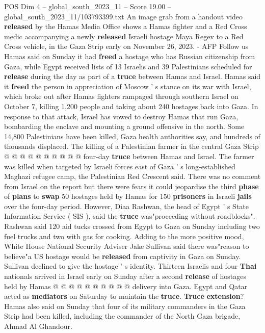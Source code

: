 \begin{textsample}{POS Dim 4 – global\_south\_2023\_11 – Score 19.00 – global\_south\_2023\_11/103793399.txt}  \label{ex:f4_pos_170}
An image grab from a handout video \textbf{released} by the Hamas Media Office shows a Hamas fighter and a Red Cross medic accompanying a newly \textbf{released} Israeli hostage Maya Regev to a Red Cross vehicle, in the Gaza Strip early on November 26, 2023. - AFP Follow us Hamas said on Sunday it had \textbf{freed} a hostage who has Russian citizenship from Gaza, while Egypt received lists of 13 Israelis and 39 Palestinians scheduled for \textbf{release} during the day as part of a \textbf{truce} between Hamas and Israel.
Hamas said it \textbf{freed} the person in appreciation of Moscow ' s stance on its war with Israel, which broke out after Hamas fighters rampaged through southern Israel on October 7, killing 1,200 people and taking about 240 hostages back into Gaza.
In response to that attack, Israel has vowed to destroy Hamas that run Gaza, bombarding the enclave and mounting a ground offensive in the north.
Some 14,800 Palestinians have been killed, Gaza health authorities say, and hundreds of thousands displaced.
The killing of a Palestinian farmer in the central Gaza Strip @ @ @ @ @ @ @ @ @ @ four-day \textbf{truce} between Hamas and Israel.
The farmer was killed when targeted by Israeli forces east of Gaza ' s long-established Maghazi refugee camp, the Palestinian Red Crescent said.
There was no comment from Israel on the report but there were fears it could jeopardise the third \textbf{phase} of \textbf{plans} to \textbf{swap} 50 hostages held by Hamas for 150 \textbf{prisoners} in Israeli \textbf{jails} over the four-day period.
However, Diaa Rashwan, the head of Egypt ' s State Information Service ( SIS ), said the \textbf{truce} was"proceeding without roadblocks".
Rashwan said 120 aid tucks crossed from Egypt to Gaza on Sunday including two fuel trucks and two with gas for cooking.
Adding to the more positive mood, White House National Security Adviser Jake Sullivan said there was"reason to believe"a US hostage would be \textbf{released} from captivity in Gaza on Sunday.
Sullivan declined to give the hostage ' s identity.
Thirteen Israelis and four \textbf{Thai} nationals arrived in Israel early on Sunday after a second \textbf{release} of hostages held by Hamas @ @ @ @ @ @ @ @ @ @ delivery into Gaza.
Egypt and Qatar acted as \textbf{mediators} on Saturday to maintain the \textbf{truce}. \textbf{Truce} \textbf{extension}?
Hamas also said on Sunday that four of its military commanders in the Gaza Strip had been killed, including the commander of the North Gaza brigade, Ahmad Al Ghandour.

\end{textsample}

